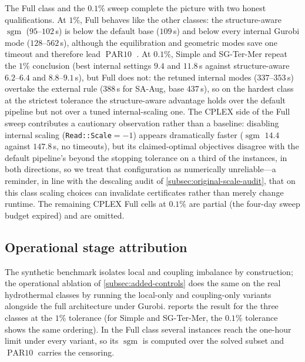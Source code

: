 \documentclass[AMA,Times1COL]{WileyNJDv5} %
\newcommand{\methodAug}{SA-Aug}
\newcommand{\sgm}{\ensuremath{\operatorname{sgm}}}
\newcommand{\PARten}{\ensuremath{\operatorname{PAR10}}}
\providecommand{\DIFadd}[1]{{\protect\color{blue} \sf #1}} %
\begin{document}
\DIFadd{The Full class and the $0.1\%$ sweep complete the picture with two honest qualifications.
At $1\%$, Full behaves like the other classes: the structure-aware $\sgm$ ($95$--$102$\,s)
is below the default base ($109$\,s) and below every internal Gurobi mode
($128$--$562$\,s), although the equilibration and geometric modes save one timeout and
therefore lead }\PARten{}\DIFadd{. At $0.1\%$, Simple and SG-Ter-Mer repeat the $1\%$ conclusion
(best internal settings $9.4$ and $11.8$\,s against structure-aware $6.2$--$6.4$ and
$8.8$--$9.1$\,s), but Full does not: the retuned internal modes ($337$--$353$\,s) overtake
the external rule ($388$\,s for \methodAug{}, base $437$\,s), so on the hardest class at
the strictest tolerance the structure-aware advantage holds over the default pipeline but
not over a tuned internal-scaling one. The CPLEX side of the Full sweep contributes a
cautionary observation rather than a baseline: disabling internal scaling
(\texttt{Read::Scale}$=-1$) appears dramatically faster ($\sgm$ $14.4$ against
$147.8$\,s, no timeouts), but its claimed-optimal objectives disagree with the default
pipeline's beyond the stopping tolerance on a third of the instances, in both directions,
so we treat that configuration as numerically unreliable---a reminder, in line with the
descaling audit of \cref{subsec:original-scale-audit}, that on this class scaling choices
can invalidate certificates rather than merely change runtime. The remaining CPLEX Full
cells at $0.1\%$ are partial (the four-day sweep budget expired) and are omitted.
}

\subsection{\DIFadd{Operational stage attribution}}
\label{subsec:stage-attribution}

\DIFadd{The synthetic benchmark isolates local and coupling imbalance by construction; the
operational ablation of \cref{subsec:added-controls} does the same on the real
hydrothermal classes by running the local-only and coupling-only variants alongside the
full architecture under Gurobi. \Cref{tab:stage-ablation} reports the result for the three
classes at the $1\%$ tolerance (for Simple and SG-Ter-Mer, the $0.1\%$ tolerance shows the
same ordering). In the Full class several instances reach the one-hour limit under every
variant, so its $\sgm$ is computed over the solved subset and }\PARten{} \DIFadd{carries the
censoring.
}
\end{document}
